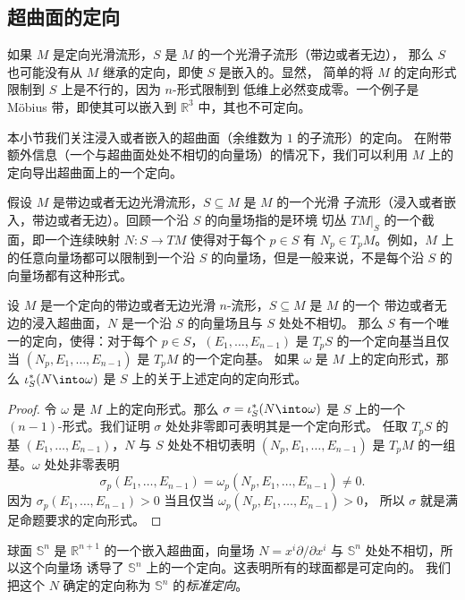 \subsection{超曲面的定向}

如果 $M$ 是定向光滑流形，$S$ 是 $M$ 的一个光滑子流形（带边或者无边），
那么 $S$ 也可能没有从 $M$ 继承的定向，即使 $S$ 是嵌入的。显然，
简单的将 $M$ 的定向形式限制到 $S$ 上是不行的，因为 $n$-形式限制到
低维上必然变成零。一个例子是 M\"obius 带，即使其可以嵌入到 $\mathbb{R}^3$
中，其也不可定向。

本小节我们关注浸入或者嵌入的超曲面（余维数为 $1$ 的子流形）的定向。
在附带额外信息（一个与超曲面处处不相切的向量场）的情况下，我们可以利用
$M$ 上的定向导出超曲面上的一个定向。

假设 $M$ 是带边或者无边光滑流形，$S\subseteq M$ 是 $M$ 的一个光滑
子流形（浸入或者嵌入，带边或者无边）。回顾一个沿 $S$ 的向量场指的是环境
切丛 $TM|_S$ 的一个截面，即一个连续映射 $N:S\to TM$ 使得对于每个 $p\in S$
有 $N_p\in T_pM$。例如，$M$ 上的任意向量场都可以限制到一个沿 $S$
的向量场，但是一般来说，不是每个沿 $S$ 的向量场都有这种形式。

\begin{proposition}\label{prop:induced orientation on hypersurface}
  设 $M$ 是一个定向的带边或者无边光滑 $n$-流形，$S\subseteq M$ 是 $M$ 的一个
  带边或者无边的浸入超曲面，$N$ 是一个沿 $S$ 的向量场且与 $S$ 处处不相切。
  那么 $S$ 有一个唯一的定向，使得：对于每个 $p\in S$，$(E_1,\dots,E_{n-1})$
  是 $T_pS$ 的一个定向基当且仅当 $(N_p,E_1,\dots,E_{n-1})$ 是 $T_pM$ 的一个定向基。
  如果 $\omega$ 是 $M$ 上的定向形式，那么 $\iota_S^*(N\into\omega)$ 是
  $S$ 上的关于上述定向的定向形式。
\end{proposition}
\begin{proof}
  令 $\omega$ 是 $M$ 上的定向形式。那么 $\sigma=\iota_S^*(N\into \omega)$ 是
  $S$ 上的一个 $(n-1)$-形式。我们证明 $\sigma$ 处处非零即可表明其是一个定向形式。
  任取 $T_pS$ 的基 $(E_1,\dots,E_{n-1})$，$N$ 与 $S$ 处处不相切表明
  $(N_p,E_1,\dots,E_{n-1})$ 是 $T_pM$ 的一组基。$\omega$ 处处非零表明
  \[
    \sigma_p(E_1,\dots,E_{n-1})=\omega_p(N_p,E_1,\dots,E_{n-1})\neq 0.
  \]
  因为 $\sigma_p(E_1,\dots,E_{n-1})>0$ 当且仅当 $\omega_p(N_p,E_1,\dots,E_{n-1})>0$，
  所以 $\sigma$ 就是满足命题要求的定向形式。
\end{proof}

\begin{example}
  球面 $\mathbb{S}^n$ 是 $\mathbb{R}^{n+1}$ 的一个嵌入超曲面，向量场
  $N=x^i\partial/\partial x^i$ 与 $\mathbb{S}^n$ 处处不相切，所以这个向量场
  诱导了 $\mathbb{S}^n$ 上的一个定向。这表明所有的球面都是可定向的。
  我们把这个 $N$ 确定的定向称为 $\mathbb{S}^n$ 的\emph{标准定向}。
\end{example}

